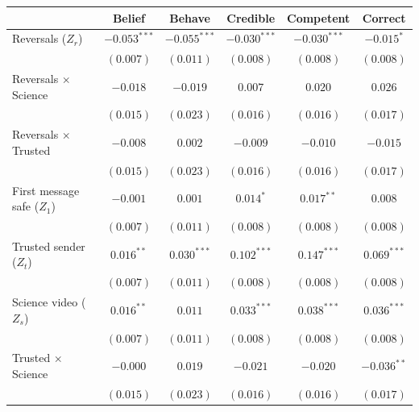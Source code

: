 
\begin{table}
\begin{center}
\begin{tabular}{l c c || c c || c}
\hline
 & Belief & Behave & Credible & Competent & Correct \\
\hline
Reversals ($Z_r$)                      & $-0.053^{***}$ & $-0.055^{***}$ & $-0.030^{***}$ & $-0.030^{***}$ & $-0.015^{*}$   \\
                                       & $(0.007)$      & $(0.011)$      & $(0.008)$      & $(0.008)$      & $(0.008)$      \\
Reversals $\times$ Science             & $-0.018$       & $-0.019$       & $0.007$        & $0.020$        & $0.026$        \\
                                       & $(0.015)$      & $(0.023)$      & $(0.016)$      & $(0.016)$      & $(0.017)$      \\
Reversals $\times$ Trusted             & $-0.008$       & $0.002$        & $-0.009$       & $-0.010$       & $-0.015$       \\
                                       & $(0.015)$      & $(0.023)$      & $(0.016)$      & $(0.016)$      & $(0.017)$      \\
First message safe ($Z_1$)             & $-0.001$       & $0.001$        & $0.014^{*}$    & $0.017^{**}$   & $0.008$        \\
                                       & $(0.007)$      & $(0.011)$      & $(0.008)$      & $(0.008)$      & $(0.008)$      \\
Trusted sender ($Z_t$)                 & $0.016^{**}$   & $0.030^{***}$  & $0.102^{***}$  & $0.147^{***}$  & $0.069^{***}$  \\
                                       & $(0.007)$      & $(0.011)$      & $(0.008)$      & $(0.008)$      & $(0.008)$      \\
Science video ($Z_s$)                  & $0.016^{**}$   & $0.011$        & $0.033^{***}$  & $0.038^{***}$  & $0.036^{***}$  \\
                                       & $(0.007)$      & $(0.011)$      & $(0.008)$      & $(0.008)$      & $(0.008)$      \\
Trusted $\times$ Science               & $-0.000$       & $0.019$        & $-0.021$       & $-0.020$       & $-0.036^{**}$  \\
                                       & $(0.015)$      & $(0.023)$      & $(0.016)$      & $(0.016)$      & $(0.017)$      \\

\end{tabular}
\end{center}
\end{table}
